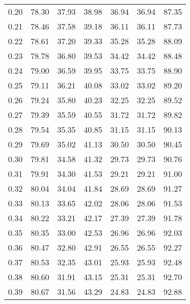 \begin{tabular}{|c|c|c|c|c|c|c|}
      0.20 &     78.30 &     37.93 &      38.98 &   36.94 &      36.94 &         87.35 \\
      0.21 &     78.46 &     37.58 &      39.18 &   36.11 &      36.11 &         87.73 \\
      0.22 &     78.61 &     37.20 &      39.33 &   35.28 &      35.28 &         88.09 \\
      0.23 &     78.78 &     36.80 &      39.53 &   34.42 &      34.42 &         88.48 \\
      0.24 &     79.00 &     36.59 &      39.95 &   33.75 &      33.75 &         88.90 \\
      0.25 &     79.11 &     36.21 &      40.08 &   33.02 &      33.02 &         89.20 \\
      0.26 &     79.24 &     35.80 &      40.23 &   32.25 &      32.25 &         89.52 \\
      0.27 &     79.39 &     35.59 &      40.55 &   31.72 &      31.72 &         89.82 \\
      0.28 &     79.54 &     35.35 &      40.85 &   31.15 &      31.15 &         90.13 \\
      0.29 &     79.69 &     35.02 &      41.13 &   30.50 &      30.50 &         90.45 \\
      0.30 &     79.81 &     34.58 &      41.32 &   29.73 &      29.73 &         90.76 \\
      0.31 &     79.91 &     34.30 &      41.53 &   29.21 &      29.21 &         91.00 \\
      0.32 &     80.04 &     34.04 &      41.84 &   28.69 &      28.69 &         91.27 \\
      0.33 &     80.13 &     33.65 &      42.02 &   28.06 &      28.06 &         91.53 \\
      0.34 &     80.22 &     33.21 &      42.17 &   27.39 &      27.39 &         91.78 \\
      0.35 &     80.35 &     33.00 &      42.53 &   26.96 &      26.96 &         92.03 \\
      0.36 &     80.47 &     32.80 &      42.91 &   26.55 &      26.55 &         92.27 \\
      0.37 &     80.53 &     32.35 &      43.01 &   25.93 &      25.93 &         92.48 \\
      0.38 &     80.60 &     31.91 &      43.15 &   25.31 &      25.31 &         92.70 \\
      0.39 &     80.67 &     31.56 &      43.29 &   24.83 &      24.83 &         92.88 \\

\end{tabular}
